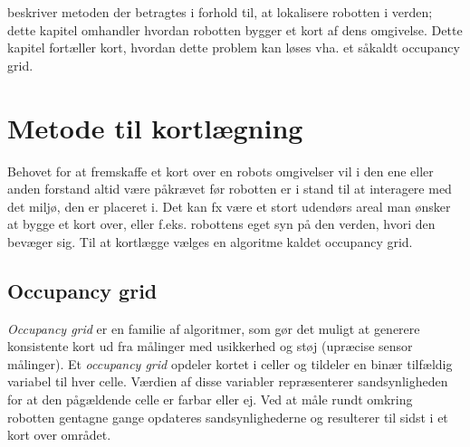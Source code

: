  beskriver metoden der betragtes i forhold til, at lokalisere robotten i verden; dette kapitel omhandler hvordan robotten bygger et kort af dens omgivelse.
Dette kapitel fortæller kort, hvordan dette problem kan løses vha. et såkaldt occupancy grid.

\section{Metode til kortlægning}
Behovet for at fremskaffe et kort over en robots omgivelser vil i den ene eller anden forstand altid være påkrævet før robotten er i stand til at interagere med det miljø, den er placeret i.
Det kan fx være et stort udendørs areal man ønsker at bygge et kort over, eller f.eks. robottens eget syn på den verden, hvori den bevæger sig.
Til at kortlægge vælges en algoritme kaldet occupancy grid. 

\subsection{Occupancy grid}
\textit{Occupancy grid} er en familie af algoritmer, som gør det muligt at generere konsistente kort ud fra målinger med usikkerhed og støj (upræcise sensor målinger).
Et \textit{occupancy grid} opdeler kortet i celler og tildeler en binær tilfældig variabel til hver celle.
Værdien af disse variabler repræsenterer sandsynligheden for at den pågældende celle er farbar eller ej.
Ved at måle rundt omkring robotten gentagne gange opdateres sandsynlighederne og resulterer til sidst i et kort over området.